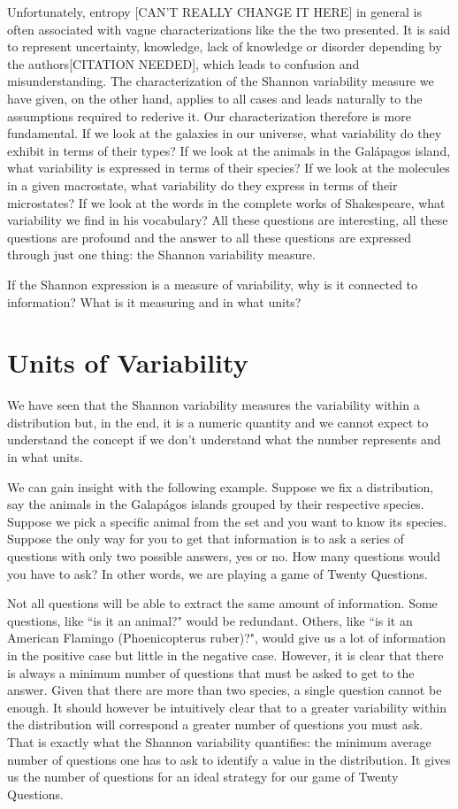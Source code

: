 \documentclass{article}
\begin{document}
Unfortunately, entropy [CAN'T REALLY CHANGE IT HERE] in general is often associated with vague characterizations like the the two presented. It is said to represent uncertainty, knowledge, lack of knowledge or disorder depending by the authors[CITATION NEEDED], which leads to confusion and misunderstanding.  The characterization of the Shannon variability measure we have given, on the other hand, applies to all cases and leads naturally to the assumptions required to rederive it. Our characterization therefore is more fundamental. If we look at the galaxies in our universe, what variability do they exhibit in terms of their types? If we look at the animals in the Gal\'{a}pagos island, what variability is expressed in terms of their species? If we look at the molecules in a given macrostate, what variability do they express in terms of their microstates? If we look at the words in the complete works of Shakespeare, what variability we find in his vocabulary? All these questions are interesting, all these questions are profound and the answer to all these questions are expressed through just one thing: the Shannon variability measure.

If the Shannon expression is a measure of variability, why is it connected to information? What is it measuring and in what units?

\section{Units of Variability\label{uv}}



We have seen that the Shannon variability measures the variability within a distribution but, in the end, it is a numeric quantity and we cannot expect to understand the concept if we don't understand what the number represents and in what units.

We can gain insight with the following example. Suppose we fix a distribution, say the animals in the Galap\'{a}gos islands grouped by their respective species. Suppose we pick a specific animal from the set and you want to know its species. Suppose the only way for you to get that information is to ask a series of questions with only two possible answers, yes or no. How many questions would you have to ask? In other words, we are playing a game of Twenty Questions.

Not all questions will be able to extract the same amount of information. Some questions, like ``is it an animal?" would be redundant. Others, like ``is it an American Flamingo (Phoenicopterus ruber)?", would give us a lot of information in the positive case but little in the negative case. However, it is clear that there is always a minimum number of questions that must be asked to get to the answer. Given that there are more than two species, a single question cannot be enough. It should however be intuitively clear that to a greater variability within the distribution will correspond a greater number of questions you must ask. That is exactly what the Shannon variability quantifies: the minimum average number of questions one has to ask to identify a value in the distribution. It gives us the number of questions for an ideal strategy for our game of Twenty Questions.
\end{document}
